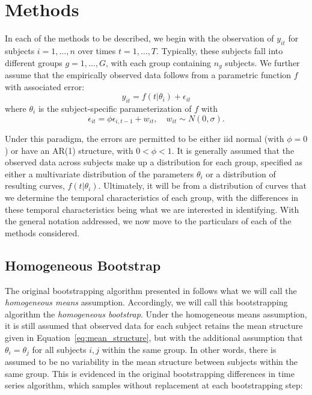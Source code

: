 \documentclass{article}
\begin{document}
\section{Methods}

In each of the methods to be described, we begin with the observation of $y_{it}$ for subjects $i = 1, \dots, n$ over times $t = 1, \dots, T$. Typically, these subjects fall into different groups $g = 1, \dots, G$, with each group containing $n_g$ subjects. We further assume that the empirically observed data follows from a parametric function $f$ with associated error:
\begin{equation}\label{eq:mean_structure}
y_{it} = f(t|\theta_i) + \epsilon_{it}
\end{equation}
where $\theta_i$ is the subject-specific parameterization of $f$ with
\begin{equation}
\epsilon_{it} = \phi \epsilon_{i, t-1} + w_{it}, \quad w_{it} \sim N(0, \sigma).
\end{equation}

Under this paradigm, the errors are permitted to be either iid normal (with $\phi = 0$) or have an AR(1) structure, with $0 < \phi < 1$. It is generally assumed that the observed data across subjects make up a distribution for each group, specified as either a multivariate distribution of the parameters $\theta_i$ or a distribution of resulting curves, $f(t|\theta_i)$. Ultimately, it will be from a distribution of curves that we determine the temporal characteristics of each group, with the differences in these temporal characteristics being what we are interested in identifying. With the general notation addressed, we now move to the particulars of each of the methods considered.

\subsection{Homogeneous Bootstrap}

The original bootstrapping algorithm presented in \citet{oleson2017detecting} follows what we will call the \textit{homogeneous means} assumption. Accordingly, we will call this bootstrapping algorithm the \textit{homogeneous bootstrap}. Under the homogeneous means assumption, it is still assumed that observed data for each subject retains the mean structure given in Equation~\ref{eq:mean_structure}, but with the additional assumption that $\theta_i = \theta_j$ for all subjects $i, j$ within the same group. In other words, there is assumed to be no variability in the mean structure between subjects within the same group. This is evidenced in the original bootstrapping differences in time series algorithm, which samples without replacement at each bootstrapping step:
\end{document}

